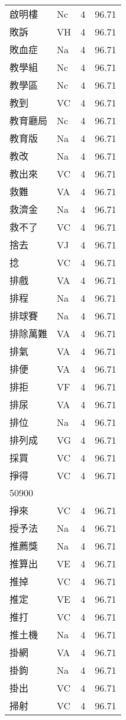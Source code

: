 \documentclass[twocolumn]{book}
\begin{document}
\begin{supertabular}{llrr}
啟明樓 & Nc & 4 &  96.71\\
敗訴 & VH & 4 &  96.71\\
敗血症 & Na & 4 &  96.71\\
教學組 & Nc & 4 &  96.71\\
教學區 & Nc & 4 &  96.71\\
教到 & VC & 4 &  96.71\\
教育廳局 & Nc & 4 &  96.71\\
教育版 & Na & 4 &  96.71\\
教改 & Na & 4 &  96.71\\
教出來 & VC & 4 &  96.71\\
救難 & VA & 4 &  96.71\\
救濟金 & Na & 4 &  96.71\\
救不了 & VC & 4 &  96.71\\
捨去 & VJ & 4 &  96.71\\
捻 & VC & 4 &  96.71\\
排戲 & VA & 4 &  96.71\\
排程 & Na & 4 &  96.71\\
排球賽 & Na & 4 &  96.71\\
排除萬難 & VA & 4 &  96.71\\
排氣 & VA & 4 &  96.71\\
排便 & VA & 4 &  96.71\\
排拒 & VF & 4 &  96.71\\
排尿 & VA & 4 &  96.71\\
排位 & Na & 4 &  96.71\\
排列成 & VG & 4 &  96.71\\
採買 & VC & 4 &  96.71\\
掙得 & VC & 4 &  96.71\\
50900\\
掙來 & VC & 4 &  96.71\\
授予法 & Na & 4 &  96.71\\
推薦獎 & Na & 4 &  96.71\\
推算出 & VE & 4 &  96.71\\
推掉 & VC & 4 &  96.71\\
推定 & VE & 4 &  96.71\\
推打 & VC & 4 &  96.71\\
推土機 & Na & 4 &  96.71\\
掛網 & VA & 4 &  96.71\\
掛鉤 & Na & 4 &  96.71\\
掛出 & VC & 4 &  96.71\\
掃射 & VC & 4 &  96.71\\

\end{supertabular}
\end{document}
